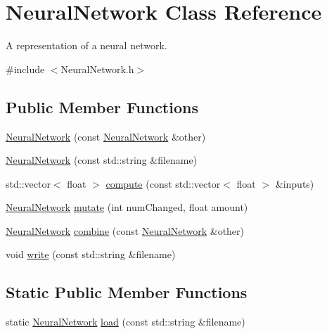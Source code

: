 \hypertarget{classNeuralNetwork}{\section{Neural\-Network Class Reference}
\label{classNeuralNetwork}
}


A representation of a neural network.  




{\ttfamily \#include $<$Neural\-Network.\-h$>$}

\subsection*{Public Member Functions}
\begin{DoxyCompactItemize}
\item 
\hyperlink{classNeuralNetwork_a993f0131fa3470bd936f205a1de97346}{Neural\-Network} (const \hyperlink{classNeuralNetwork}{Neural\-Network} \&other)
\item 
\hyperlink{classNeuralNetwork_a1a07b6aec54c5890b2a8d612fd684289}{Neural\-Network} (const std\-::string \&filename)
\item 
std\-::vector$<$ float $>$ \hyperlink{classNeuralNetwork_ae69f98b81f2ca075327a0b4b83fe593e}{compute} (const std\-::vector$<$ float $>$ \&inputs)
\item 
\hyperlink{classNeuralNetwork}{Neural\-Network} \hyperlink{classNeuralNetwork_a28d9213fcff2a94a4d26b11354d248c8}{mutate} (int num\-Changed, float amount)
\item 
\hyperlink{classNeuralNetwork}{Neural\-Network} \hyperlink{classNeuralNetwork_a68d01cce8de3c89a174e4f4f77dcbbcd}{combine} (const \hyperlink{classNeuralNetwork}{Neural\-Network} \&other)
\item 
void \hyperlink{classNeuralNetwork_a716f02c9468ddfaf53f8eaf19b755f44}{write} (const std\-::string \&filename)
\end{DoxyCompactItemize}
\subsection*{Static Public Member Functions}
\begin{DoxyCompactItemize}
\item 
static \hyperlink{classNeuralNetwork}{Neural\-Network} \hyperlink{classNeuralNetwork_a079b5b4583999d6b35b4b8bb23a68fb7}{load} (const std\-::string \&filename)
\end{DoxyCompactItemize}



